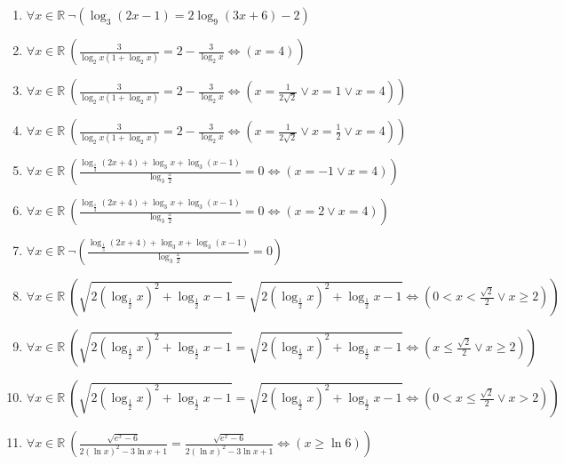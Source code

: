 \documentclass[11pt,a4paper]{article}
\begin{document}
\begin{enumerate}
\item $\displaystyle \forall x \in \mathbb{R}\ \lnot \left( \log_{3}(2x - 1) = 2\log_{9}(3x + 6) - 2 \right)$
\item $\displaystyle \forall x \in \mathbb{R}\ \left( \frac{3}{\log_{2} x(1 + \log_{2} x)} = 2 - \frac{3}{\log_{2} x} \iff \left( x = 4 \right) \right)$
\item $\displaystyle \forall x \in \mathbb{R}\ \left( \frac{3}{\log_{2} x(1 + \log_{2} x)} = 2 - \frac{3}{\log_{2} x} \iff \left( x = \frac{1}{2\sqrt{2}} \lor x = 1 \lor x = 4 \right) \right)$
\item $\displaystyle \forall x \in \mathbb{R}\ \left( \frac{3}{\log_{2} x(1 + \log_{2} x)} = 2 - \frac{3}{\log_{2} x} \iff \left( x = \frac{1}{2\sqrt{2}} \lor x = \frac{1}{2} \lor x = 4 \right) \right)$
\item $\displaystyle \forall x \in \mathbb{R}\ \left( \frac{\log_{\frac{1}{3}}(2x + 4) + \log_{3} x + \log_{3}(x - 1)}{\log_{3}\frac{x}{2}} = 0 \iff \left( x = -1 \lor x = 4 \right) \right)$
\item $\displaystyle \forall x \in \mathbb{R}\ \left( \frac{\log_{\frac{1}{3}}(2x + 4) + \log_{3} x + \log_{3}(x - 1)}{\log_{3}\frac{x}{2}} = 0 \iff \left( x = 2 \lor x = 4 \right) \right)$
\item $\displaystyle \forall x \in \mathbb{R}\ \lnot \left( \frac{\log_{\frac{1}{3}}(2x + 4) + \log_{3} x + \log_{3}(x - 1)}{\log_{3}\frac{x}{2}} = 0 \right)$
\item $\displaystyle \forall x \in \mathbb{R}\ \left( \sqrt{2\left(\log_{\frac{1}{2}} x\right)^{2} + \log_{\frac{1}{2}} x - 1} = \sqrt{2\left(\log_{\frac{1}{2}} x\right)^{2} + \log_{\frac{1}{2}} x - 1} \iff \left( 0 < x < \frac{\sqrt{2}}{2} \lor x \ge 2 \right) \right)$
\item $\displaystyle \forall x \in \mathbb{R}\ \left( \sqrt{2\left(\log_{\frac{1}{2}} x\right)^{2} + \log_{\frac{1}{2}} x - 1} = \sqrt{2\left(\log_{\frac{1}{2}} x\right)^{2} + \log_{\frac{1}{2}} x - 1} \iff \left( x \le \frac{\sqrt{2}}{2} \lor x \ge 2 \right) \right)$
\item $\displaystyle \forall x \in \mathbb{R}\ \left( \sqrt{2\left(\log_{\frac{1}{2}} x\right)^{2} + \log_{\frac{1}{2}} x - 1} = \sqrt{2\left(\log_{\frac{1}{2}} x\right)^{2} + \log_{\frac{1}{2}} x - 1} \iff \left( 0 < x \le \frac{\sqrt{2}}{2} \lor x > 2 \right) \right)$
\item $\displaystyle \forall x \in \mathbb{R}\ \left( \frac{\sqrt{e^{x} - 6}}{2\left(\ln x\right)^{2} - 3\ln x + 1} = \frac{\sqrt{e^{x} - 6}}{2\left(\ln x\right)^{2} - 3\ln x + 1} \iff \left( x \ge \ln 6 \right) \right)$

\end{enumerate}
\end{document}
